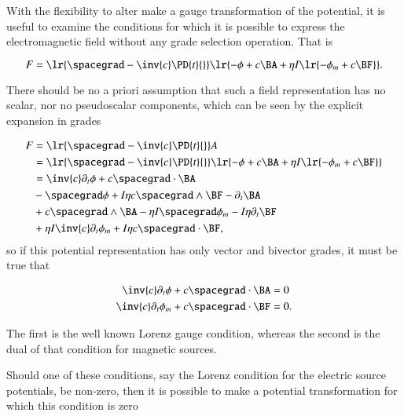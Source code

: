 %
%
With the flexibility to alter make a gauge transformation of the potential, it is useful to examine the conditions for which it is possible to express the electromagnetic field without any grade selection operation.
That is

\begin{dmath}\label{eqn:potentialSection_LorenzGauge:1720}
F
=
\lr{ \spacegrad - \inv{c} \PD{t}{} }
\lr{
      - \phi
      + c \BA
      + \eta I \lr{ -\phi_m + c \BF }
}.
\end{dmath}

There should be no a priori assumption that such a field representation has no scalar, nor no pseudoscalar components, which can be seen by the explicit expansion in grades

\begin{dmath}\label{eqn:potentialSection_LorenzGauge:1640}
\begin{aligned}
F
&=
\lr{ \spacegrad - \inv{c} \PD{t}{} } A \\
&=
\lr{ \spacegrad - \inv{c} \PD{t}{} } \lr{ -\phi + c \BA + \eta I \lr{ -\phi_m + c \BF } } \\
&=
\inv{c} \partial_t \phi
+ c \spacegrad \cdot \BA  \\
&-\spacegrad \phi
+ I \eta c \spacegrad \wedge \BF
- \partial_t \BA  \\
&+ c \spacegrad \wedge \BA
- \eta I \spacegrad \phi_m
- I \eta \partial_t \BF \\
&+ \eta I \inv{c} \partial_t \phi_m
+ I \eta c \spacegrad \cdot \BF,
\end{aligned}
\end{dmath}
so if this potential representation has only vector and bivector grades, it must be true that

\begin{dmath}\label{eqn:potentialSection_LorenzGauge:1660}
\begin{aligned}
\inv{c} \partial_t \phi + c \spacegrad \cdot \BA &= 0 \\
\inv{c} \partial_t \phi_m + c \spacegrad \cdot \BF &= 0.
\end{aligned}
\end{dmath}

The first is the well known Lorenz gauge condition, whereas the second is the dual of that condition for magnetic sources.

Should one of these conditions, say the Lorenz condition for the electric source potentials, be non-zero, then it is possible to make a potential transformation for which this condition is zero

